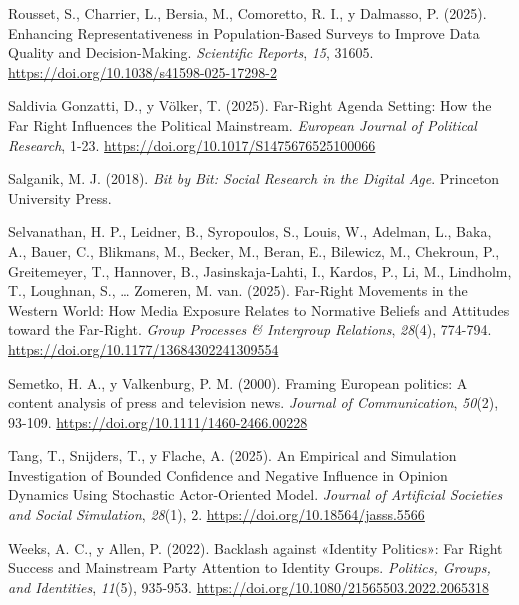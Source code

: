 \documentclass[
  letterpaper,
  numbers=noendperiod,
  fontsize=11pt,
  DIV=12,
  titlepage=false]{scrreprt}
\newlength{\cslhangindent}
\newenvironment{CSLReferences}[2] %
 {\begin{list}{}{%
  \setlength{\itemindent}{0pt}
  \setlength{\leftmargin}{0pt}
  \setlength{\parsep}{0pt}
  \ifodd #1
   \setlength{\leftmargin}{\cslhangindent}
   \setlength{\itemindent}{-1\cslhangindent}
  \fi
  \setlength{\itemsep}{#2\baselineskip}}}
 {\end{list}}
\begin{document}
\begin{CSLReferences}{1}{0}
Rousset, S., Charrier, L., Bersia, M., Comoretto, R. I., y Dalmasso, P.
(2025). Enhancing Representativeness in Population-Based Surveys to
Improve Data Quality and Decision-Making. \emph{Scientific Reports},
\emph{15}, 31605. \url{https://doi.org/10.1038/s41598-025-17298-2}

Saldivia Gonzatti, D., y Völker, T. (2025). Far-Right Agenda Setting:
{How} the Far Right Influences the Political Mainstream. \emph{European
Journal of Political Research}, 1-23.
\url{https://doi.org/10.1017/S1475676525100066}

Salganik, M. J. (2018). \emph{Bit by Bit: Social Research in the Digital
Age}. Princeton University Press.

Selvanathan, H. P., Leidner, B., Syropoulos, S., Louis, W., Adelman, L.,
Baka, A., Bauer, C., Blikmans, M., Becker, M., Beran, E., Bilewicz, M.,
Chekroun, P., Greitemeyer, T., Hannover, B., Jasinskaja-Lahti, I.,
Kardos, P., Li, M., Lindholm, T., Loughnan, S., \ldots{} Zomeren, M.
van. (2025). Far-Right Movements in the {Western World}: How Media
Exposure Relates to Normative Beliefs and Attitudes toward the
Far-Right. \emph{Group Processes \& Intergroup Relations}, \emph{28}(4),
774-794. \url{https://doi.org/10.1177/13684302241309554}

Semetko, H. A., y Valkenburg, P. M. (2000). Framing {European} politics:
{A} content analysis of press and television news. \emph{Journal of
Communication}, \emph{50}(2), 93-109.
\url{https://doi.org/10.1111/1460-2466.00228}

Tang, T., Snijders, T., y Flache, A. (2025). An {Empirical} and
{Simulation Investigation} of {Bounded Confidence} and {Negative
Influence} in {Opinion Dynamics Using Stochastic Actor-Oriented Model}.
\emph{Journal of Artificial Societies and Social Simulation},
\emph{28}(1), 2. \url{https://doi.org/10.18564/jasss.5566}

Weeks, A. C., y Allen, P. (2022). Backlash against {«Identity
Politics»}: Far Right Success and Mainstream Party Attention to Identity
Groups. \emph{Politics, Groups, and Identities}, \emph{11}(5), 935-953.
\url{https://doi.org/10.1080/21565503.2022.2065318}

\end{CSLReferences}

\nocite{*}
\end{document}
